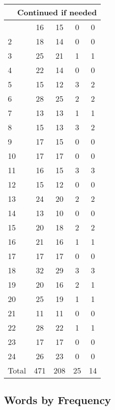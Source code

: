\begin{center}
\begin{longtable}{l|c|c|c|c}
\hline \multicolumn{5}{|r|}{{Continued if needed}} \\ \hline
\endfoot 
1 & 16 & 15 & 0 & 0\\ \hline
2 & 18 & 14 & 0 & 0\\ \hline
3 & 25 & 21 & 1 & 1\\ \hline
4 & 22 & 14 & 0 & 0\\ \hline
5 & 15 & 12 & 3 & 2\\ \hline
6 & 28 & 25 & 2 & 2\\ \hline
7 & 13 & 13 & 1 & 1\\ \hline
8 & 15 & 13 & 3 & 2\\ \hline
9 & 17 & 15 & 0 & 0\\ \hline
10 & 17 & 17 & 0 & 0\\ \hline
11 & 16 & 15 & 3 & 3\\ \hline
12 & 15 & 12 & 0 & 0\\ \hline
13 & 24 & 20 & 2 & 2\\ \hline
14 & 13 & 10 & 0 & 0\\ \hline
15 & 20 & 18 & 2 & 2\\ \hline
16 & 21 & 16 & 1 & 1\\ \hline
17 & 17 & 17 & 0 & 0\\ \hline
18 & 32 & 29 & 3 & 3\\ \hline
19 & 20 & 16 & 2 & 1\\ \hline
20 & 25 & 19 & 1 & 1\\ \hline
21 & 11 & 11 & 0 & 0\\ \hline
22 & 28 & 22 & 1 & 1\\ \hline
23 & 17 & 17 & 0 & 0\\ \hline
24 & 26 & 23 & 0 & 0\\ \hline
\hline \hline
Total & 471 & 208 & 25 & 14



\end{longtable}
\end{center}

 
\subsection{Words by Frequency}

